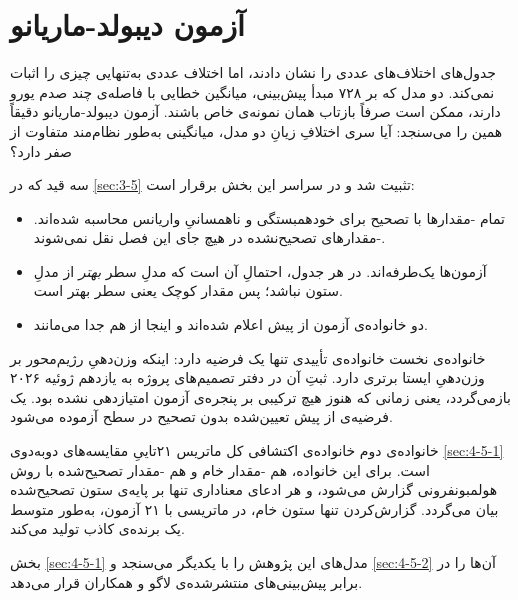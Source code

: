 
\section{آزمون دیبولد-ماریانو}
\label{sec:4-5}

جدول‌های  اختلاف‌های عددی را نشان دادند، اما اختلاف
عددی به‌تنهایی چیزی را اثبات نمی‌کند. دو مدل که بر ۷۲۸ مبدأ پیش‌بینی، میانگین خطایی
با فاصله‌ی چند صدم یورو دارند، ممکن است صرفاً بازتاب همان نمونه‌ی خاص باشند. آزمون
دیبولد-ماریانو دقیقاً همین را می‌سنجد: آیا سری اختلافِ زیانِ دو مدل، میانگینی
به‌طور نظام‌مند متفاوت از صفر دارد؟

سه قید که در \cref{sec:3-5} تثبیت شد و در سراسر این بخش برقرار است:

\begin{itemize}
  \item تمام -مقدارها با تصحیح  برای خودهمبستگی و ناهمسانیِ
        واریانس محاسبه شده‌اند. -مقدارهای تصحیح‌نشده در هیچ جای این فصل
        نقل نمی‌شوند.
  \item آزمون‌ها یک‌طرفه‌اند. در هر جدول،  احتمالِ آن است که مدلِ سطر
        \emph{بهتر} از مدلِ ستون نباشد؛ پس مقدار کوچک یعنی سطر بهتر است.
  \item دو خانواده‌ی آزمون از پیش اعلام شده‌اند و اینجا از هم جدا می‌مانند.
\end{itemize}

خانواده‌ی نخست  خانواده‌ی تأییدی  تنها یک فرضیه دارد: اینکه
وزن‌دهیِ رژیم‌محور بر وزن‌دهیِ ایستا برتری دارد. ثبتِ آن در دفتر تصمیم‌های پروژه
به یازدهم ژوئیه ۲۰۲۶ بازمی‌گردد، یعنی زمانی که هنوز هیچ ترکیبی بر پنجره‌ی
آزمون امتیازدهی نشده بود. یک فرضیه‌ی از پیش تعیین‌شده بدون تصحیح در سطح
 آزموده می‌شود.

خانواده‌ی دوم  خانواده‌ی اکتشافی  کل ماتریس ۲۱تاییِ مقایسه‌های
دوبه‌دوی \cref{sec:4-5-1} است. برای این خانواده، هم -مقدار خام و هم
-مقدار تصحیح‌شده با روش هولمبونفرونی گزارش می‌شود، و هر ادعای معناداری
تنها بر پایه‌ی ستون تصحیح‌شده بیان می‌گردد. گزارش‌کردن تنها ستون خام، در ماتریسی با
۲۱ آزمون، به‌طور متوسط یک برنده‌ی کاذب تولید می‌کند.

بخش \cref{sec:4-5-1} مدل‌های این پژوهش را با یکدیگر می‌سنجد و \cref{sec:4-5-2}
آن‌ها را در برابر پیش‌بینی‌های منتشرشده‌ی لاگو و همکاران \cite{lago_forecasting_2021}
قرار می‌دهد.
